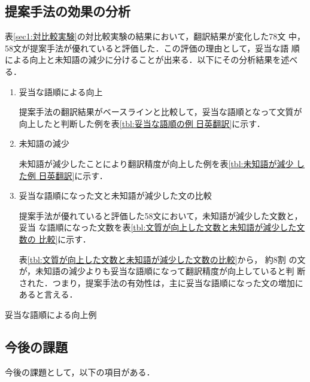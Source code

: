 \documentclass[japanese]{jnlp_1.4}
\begin{document}
\subsection{提案手法の効果の分析}

表\ref{sec1:対比較実験}の対比較実験の結果において，翻訳結果が変化した78文
中，58文が提案手法が優れていると評価した．この評価の理由として，妥当な語
順による向上と未知語の減少に分けることが出来る．以下にその分析結果を述べ
る．

\begin{enumerate}

\item{妥当な語順による向上}

提案手法の翻訳結果がベースラインと比較して，妥当な語順となって文質が
向上したと判断した例を表\ref{tbl:妥当な語順の例 日英翻訳}に示す．


\item{未知語の減少}

未知語が減少したことにより翻訳精度が向上した例を表\ref{tbl:未知語が減少
した例 日英翻訳}に示す．



\item{妥当な語順になった文と未知語が減少した文の比較}

提案手法が優れていると評価した58文において，未知語が減少した文数と，妥当
な語順になった文数を表\ref{tbl:文質が向上した文数と未知語が減少した文数の
比較}に示す．


表\ref{tbl:文質が向上した文数と未知語が減少した文数の比較}から， 約8割
の文が，未知語の減少よりも妥当な語順になって翻訳精度が向上していると判
断された．つまり，提案手法の有効性は，主に妥当な語順になった文の増加に
あると言える．

\end{enumerate}

\begin{table}[t]
\caption{妥当な語順による向上例}
\label{tbl:妥当な語順の例 日英翻訳}

\end{table}





\subsection{今後の課題}

今後の課題として，以下の項目がある．
\end{document}
